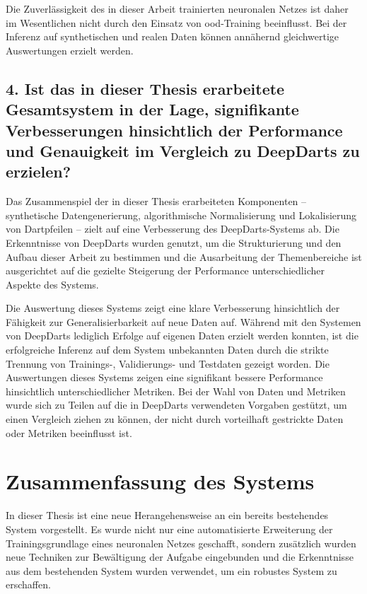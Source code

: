 Die Zuverlässigkeit des in dieser Arbeit trainierten neuronalen Netzes ist daher im Wesentlichen nicht durch den Einsatz von \ac{ood}-Training beeinflusst. Bei der Inferenz auf synthetischen und realen Daten können annähernd gleichwertige Auswertungen erzielt werden.

\subsection*{4. Ist das in dieser Thesis erarbeitete Gesamtsystem in der Lage, signifikante Verbesserungen hinsichtlich der Performance und Genauigkeit im Vergleich zu DeepDarts zu erzielen?}

Das Zusammenspiel der in dieser Thesis erarbeiteten Komponenten -- synthetische Datengenerierung, algorithmische Normalisierung und Lokalisierung von Dartpfeilen -- zielt auf eine Verbesserung des DeepDarts-Systems ab. Die Erkenntnisse von DeepDarts wurden genutzt, um die Strukturierung und den Aufbau dieser Arbeit zu bestimmen und die Ausarbeitung der Themenbereiche ist ausgerichtet auf die gezielte Steigerung der Performance unterschiedlicher Aspekte des Systems.

Die Auswertung dieses Systems zeigt eine klare Verbesserung hinsichtlich der Fähigkeit zur Generalisierbarkeit auf neue Daten auf. Während mit den Systemen von DeepDarts lediglich Erfolge auf eigenen Daten erzielt werden konnten, ist die erfolgreiche Inferenz auf dem System unbekannten Daten durch die strikte Trennung von Trainings-, Validierungs- und Testdaten gezeigt worden. Die Auswertungen dieses Systems zeigen eine signifikant bessere Performance hinsichtlich unterschiedlicher Metriken. Bei der Wahl von Daten und Metriken wurde sich zu Teilen auf die in DeepDarts verwendeten Vorgaben gestützt, um einen Vergleich ziehen zu können, der nicht durch vorteilhaft gestrickte Daten oder Metriken beeinflusst ist.

\section{Zusammenfassung des Systems}

In dieser Thesis ist eine neue Herangehensweise an ein bereits bestehendes System vorgestellt. Es wurde nicht nur eine automatisierte Erweiterung der Trainingsgrundlage eines neuronalen Netzes geschafft, sondern zusätzlich wurden neue Techniken zur Bewältigung der Aufgabe eingebunden und die Erkenntnisse aus dem bestehenden System wurden verwendet, um ein robustes System zu erschaffen.

